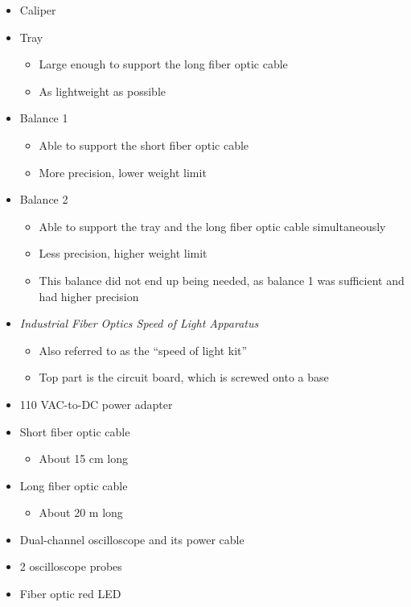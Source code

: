 \documentclass[12pt]{iopart} %
\begin{document}
\begin{itemize}
\item
  Caliper
\item
  Tray

  \begin{itemize}
  \item
    Large enough to support the long fiber optic cable
  \item
    As lightweight as possible
  \end{itemize}
\item
  Balance 1

  \begin{itemize}
  \item
    Able to support the short fiber optic cable
  \item
    More precision, lower weight limit
  \end{itemize}
\item
  Balance 2

  \begin{itemize}
  \item
    Able to support the tray and the long fiber optic cable
    simultaneously
  \item
    Less precision, higher weight limit
  \item
    This balance did not end up being needed, as balance 1 was sufficient and had higher precision
  \end{itemize}
\item
  \emph{Industrial Fiber Optics Speed of Light Apparatus}

  \begin{itemize}
  \item
    Also referred to as the ``speed of light kit''
  \item
    Top part is the circuit board, which is screwed onto a base
  \end{itemize}
\item
  110 VAC-to-DC power adapter
\item
  Short fiber optic cable

  \begin{itemize}
  \item
    About 15 cm long
  \end{itemize}
\item
  Long fiber optic cable

  \begin{itemize}
  \item
    About 20 m long
  \end{itemize}
\item
  Dual-channel oscilloscope and its power cable
\item
  2 oscilloscope probes
\item
  Fiber optic red LED


\end{itemize}
\end{document}
